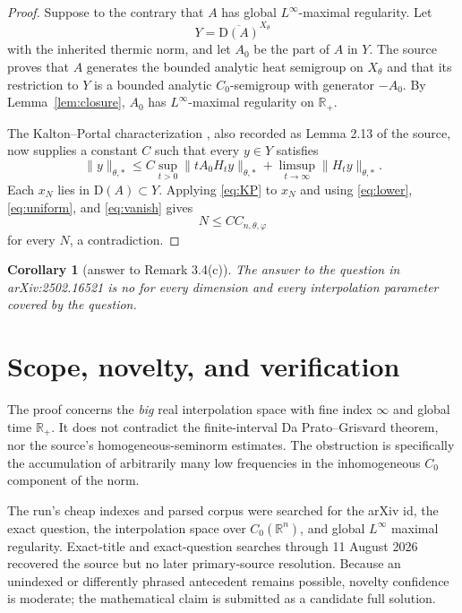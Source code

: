 \documentclass[11pt]{article}
\newtheorem{corollary}[theorem]{Corollary}
\newcommand{\R}{\mathbb R}
\newcommand{\D}{\mathrm D}
\newcommand{\closure}[1]{\overline{#1}}
\begin{document}
\begin{proof}
Suppose to the contrary that $A$ has global $L^\infty$-maximal regularity.
Let
\[
 Y=\closure{\D(A)}^{X_\theta}
\]
with the inherited thermic norm, and let $A_0$ be the part of $A$ in $Y$.
The source proves that $A$ generates the bounded analytic heat semigroup on
$X_\theta$ and that its restriction to $Y$ is a bounded analytic
$C_0$-semigroup with generator $-A_0$.  By Lemma~\ref{lem:closure}, $A_0$
has $L^\infty$-maximal regularity on $\R_+$.

The Kalton--Portal characterization \cite[Theorem 3.7]{KaltonPortal2008},
also recorded as Lemma 2.13 of the source, now supplies a constant $C$ such
that every $y\in Y$ satisfies
\begin{equation}\label{eq:KP}
 \|y\|_{\theta,*}
 \leq C\sup_{t>0}\|tA_0H_ty\|_{\theta,*}
       +\limsup_{t\to\infty}\|H_ty\|_{\theta,*}.
\end{equation}
Each $x_N$ lies in $\D(A)\subset Y$.  Applying \eqref{eq:KP} to $x_N$ and
using \eqref{eq:lower}, \eqref{eq:uniform}, and \eqref{eq:vanish} gives
\[
 N\leq C C_{n,\theta,\varphi}
\]
for every $N$, a contradiction.
\end{proof}

\begin{corollary}[answer to Remark 3.4(c)]
The answer to the question in arXiv:2502.16521 is no for every dimension and
every interpolation parameter covered by the question.
\end{corollary}

\section{Scope, novelty, and verification}

The proof concerns the \emph{big} real interpolation space with fine index
$\infty$ and global time $\R_+$.  It does not contradict the finite-interval
Da Prato--Grisvard theorem, nor the source's homogeneous-seminorm estimates.
The obstruction is specifically the accumulation of arbitrarily many low
frequencies in the inhomogeneous $C_0$ component of the norm.

The run's cheap indexes and parsed corpus were searched for the arXiv id, the
exact question, the interpolation space over $C_0(\R^n)$, and global
$L^\infty$ maximal regularity.  Exact-title and exact-question searches
through 11 August 2026 recovered the source but no later primary-source
resolution.  Because an unindexed or differently phrased antecedent remains
possible, novelty confidence is moderate; the mathematical claim is
submitted as a candidate full solution.
\end{document}
